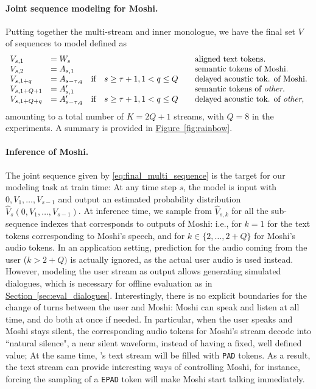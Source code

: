 \paragraph{Joint sequence modeling for Moshi.}

Putting together the multi-stream and inner monologue, we have the final set $V$ of sequences to model defined as
\begin{equation}
\label{eq:final_multi_sequence}
    \begin{array}{lll}
    V_{s, 1} &= W_{s} \quad &\text{aligned text tokens.} \\
    V_{s, 2} &= A_{s, 1} \quad &\text{semantic tokens of Moshi.}\\
    V_{s, 1 + q} &= A_{s - \tau, q} \quad \text{if}\quad s \geq \tau + 1, 1 < q \leq Q \quad &\text{delayed acoustic tok. of Moshi.}\\
    V_{s, 1 + Q + 1} &= A'_{s, 1} \quad &\text{semantic tokens of \emph{other}.}\\
    V_{s, 1 + Q + q} &= A'_{s - \tau, q} \quad \text{if}\quad s \geq \tau + 1, 1 < q \leq Q\quad &\text{delayed acoustic tok. of \emph{other},}\\
    \end{array}
\end{equation}
amounting to a total number of $K=2Q+1$ streams, with $Q=8$ in the experiments. 
A summary is provided in \hyperref[fig:rainbow]{Figure~\ref{fig:rainbow}}.

\paragraph{Inference of Moshi.}
The joint sequence given by \autoref{eq:final_multi_sequence} is the target for our modeling task at train time: At any time step $s$, the model is input with $0, V_1, \ldots, V_{s - 1}$ and output an estimated probability distribution $\hat{V}_{s}(0, V_1, \ldots, V_{s - 1})$.
At inference time, we sample from $\hat{V}_{s, k}$ for all the sub-sequence indexes that corresponds to outputs of Moshi: i.e., for $k=1$ for the text tokens corresponding to Moshi's speech, and for $k \in \{2, \ldots, 2 + Q\}$ for Moshi's audio tokens. In an application setting, prediction for the audio coming from the user ($k > 2 + Q)$ is actually ignored, as the actual user audio is used instead. However, modeling the user stream as output allows generating simulated dialogues, which is necessary for offline evaluation as in \hyperref[sec:eval_dialogues]{Section~\ref{sec:eval_dialogues}}. Interestingly, there is no explicit boundaries for the change of turns between the user and Moshi: Moshi can speak and listen at all time, and do both at once if needed. In particular, when the user speaks and Moshi stays silent, the corresponding audio tokens for Moshi's stream decode into ``natural silence", a near silent waveform, instead of having a fixed, well defined value; At the same time, \ours{}'s text stream will be filled with \texttt{PAD} tokens. As a result, the text stream can provide interesting ways of controlling Moshi, for instance, forcing the sampling of a \texttt{EPAD} token will make Moshi start talking immediately.
